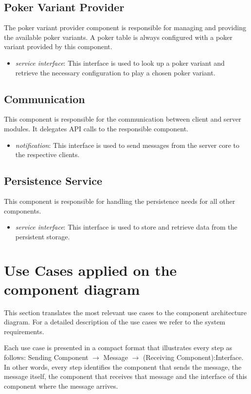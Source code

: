 \documentclass[a4paper,11pt]{report}
\begin{document}
\subsection{Poker Variant Provider}
The poker variant provider component is responsible for managing and providing the available poker variants. A  poker table is always configured with a poker variant provided by this component.
\begin{itemize}
\item \emph{service interface}: This interface is used to look up a poker variant and retrieve the necessary configuration to play a chosen poker variant.
\end{itemize}

\subsection{Communication}
This component is responsible for the communication between client and server modules. It delegates API calls to the responsible component.
\begin{itemize}
\item \emph{notification}: This interface is used to send messages from the server core to the respective clients.
\end{itemize}

\subsection{Persistence Service}
This component is responsible for handling the persistence needs for all other components.
\begin{itemize}
\item \emph{service interface}: This interface is used to store and retrieve data from the persistent storage.
\end{itemize}

\section{Use Cases applied on the component diagram}
This section translates the most relevant use cases to the component architecture diagram. For a detailed description of the use cases we refer to the system requirements.

Each use case is presented in a compact format that illustrates every step as follows: Sending Component $\rightarrow$ Message $\rightarrow$ (Receiving Component):Interface. In other words, every step identifies the component that sends the message, the message itself, the component that receives that message and the interface of this component where the message arrives.
\end{document}
